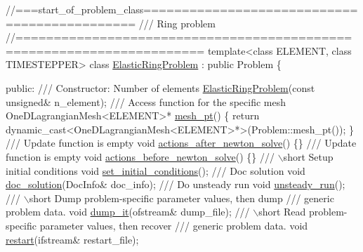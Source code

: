  
\begin{DoxyCodeInclude}
\textcolor{comment}{//===start\_of\_problem\_class=============================================}
\textcolor{comment}{/// Ring problem}
\textcolor{comment}{}\textcolor{comment}{//======================================================================}
\textcolor{keyword}{template}<\textcolor{keyword}{class} ELEMENT, \textcolor{keyword}{class} TIMESTEPPER>
\textcolor{keyword}{class }\hyperlink{classElasticRingProblem}{ElasticRingProblem} : \textcolor{keyword}{public} Problem
\{

\textcolor{keyword}{public}:
\textcolor{comment}{}
\textcolor{comment}{ /// Constructor: Number of elements}
\textcolor{comment}{} \hyperlink{classElasticRingProblem_a57be33a379c1ec4418a7fb3e8db8ef2b}{ElasticRingProblem}(\textcolor{keyword}{const} \textcolor{keywordtype}{unsigned}& n\_element);
\textcolor{comment}{}
\textcolor{comment}{ /// Access function for the specific mesh}
\textcolor{comment}{} OneDLagrangianMesh<ELEMENT>* \hyperlink{classElasticRingProblem_a763200d4985bca4a120f2be2a217f4a8}{mesh\_pt}() 
  \{
   \textcolor{keywordflow}{return} \textcolor{keyword}{dynamic\_cast<}OneDLagrangianMesh<ELEMENT>*\textcolor{keyword}{>}(Problem::mesh\_pt());
  \}
\textcolor{comment}{}
\textcolor{comment}{ /// Update function is empty }
\textcolor{comment}{} \textcolor{keywordtype}{void} \hyperlink{classElasticRingProblem_ab0eb0dcecfa7e9c9e52ecf319f6e873e}{actions\_after\_newton\_solve}() \{\}
\textcolor{comment}{}
\textcolor{comment}{ /// Update function is empty }
\textcolor{comment}{} \textcolor{keywordtype}{void} \hyperlink{classElasticRingProblem_aac5f3adac1e1a42492bd428eeb732a3d}{actions\_before\_newton\_solve}() \{\}
 \textcolor{comment}{}
\textcolor{comment}{ /// \(\backslash\)short Setup initial conditions}
\textcolor{comment}{} \textcolor{keywordtype}{void} \hyperlink{classElasticRingProblem_ab435f36b59e5f76301123c3440363704}{set\_initial\_conditions}();
\textcolor{comment}{}
\textcolor{comment}{ /// Doc solution}
\textcolor{comment}{} \textcolor{keywordtype}{void} \hyperlink{classElasticRingProblem_a9aa904e4cf82d45711f890cd8440ced9}{doc\_solution}(DocInfo& doc\_info);
\textcolor{comment}{}
\textcolor{comment}{ /// Do unsteady run}
\textcolor{comment}{} \textcolor{keywordtype}{void} \hyperlink{classElasticRingProblem_acd30c4363ffedbaadc1523aa8b85523b}{unsteady\_run}();
\textcolor{comment}{}
\textcolor{comment}{ /// \(\backslash\)short Dump problem-specific parameter values, then dump}
\textcolor{comment}{ /// generic problem data.}
\textcolor{comment}{} \textcolor{keywordtype}{void} \hyperlink{classElasticRingProblem_a5d932c03b49cb7fe4da256a5c3c9be26}{dump\_it}(ofstream& dump\_file);
\textcolor{comment}{}
\textcolor{comment}{ /// \(\backslash\)short Read problem-specific parameter values, then recover}
\textcolor{comment}{ /// generic problem data.}
\textcolor{comment}{} \textcolor{keywordtype}{void} \hyperlink{classElasticRingProblem_a0b7d864f52a18bb2a9f3a2378d8b02aa}{restart}(ifstream& restart\_file);

\end{DoxyCodeInclude}


